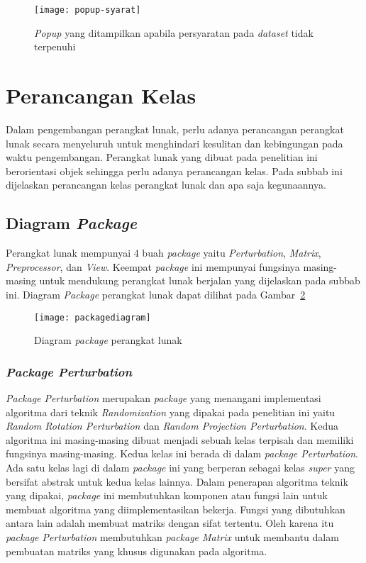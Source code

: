 \begin{figure}
	\centering
	\texttt{[image: popup-syarat]}
	\caption{\textit{Popup} yang ditampilkan apabila persyaratan pada \textit{dataset} tidak terpenuhi}
	\label{fig:popup-syarat}
\end{figure}

\section{Perancangan Kelas}
\label{sec:kelas}

Dalam pengembangan perangkat lunak, perlu adanya perancangan perangkat lunak secara menyeluruh untuk menghindari kesulitan dan kebingungan pada waktu pengembangan. Perangkat lunak yang dibuat pada penelitian ini berorientasi objek sehingga perlu adanya perancangan kelas. Pada subbab ini dijelaskan perancangan kelas perangkat lunak dan apa saja kegunaannya.

\subsection{Diagram \textit{Package}}
\label{subsec:diagram-package}

Perangkat lunak mempunyai 4 buah \textit{package} yaitu \textit{Perturbation}, \textit{Matrix}, \textit{Preprocessor}, dan \textit{View}. Keempat \textit{package} ini mempunyai fungsinya masing-masing untuk mendukung perangkat lunak berjalan yang dijelaskan pada subbab ini. Diagram \textit{Package} perangkat lunak dapat dilihat pada Gambar~\ref{fig:packagediagram}

\begin{figure}
	\centering
	\texttt{[image: packagediagram]}
	\caption{Diagram \textit{package} perangkat lunak}
	\label{fig:packagediagram}
\end{figure}

\subsubsection{\textit{Package Perturbation}}
\label{subsubsec:package-perturbation}

\textit{Package Perturbation} merupakan \textit{package} yang menangani implementasi algoritma dari teknik \textit{Randomization} yang dipakai pada penelitian ini yaitu \textit{Random Rotation Perturbation} dan \textit{Random Projection Perturbation}. Kedua algoritma ini masing-masing dibuat menjadi sebuah kelas terpisah dan memiliki fungsinya masing-masing. Kedua kelas ini berada di dalam \textit{package Perturbation}. Ada satu kelas lagi di dalam \textit{package} ini yang berperan sebagai kelas \textit{super} yang bersifat abstrak untuk kedua kelas lainnya. Dalam penerapan algoritma teknik yang dipakai, \textit{package} ini membutuhkan komponen atau fungsi lain untuk membuat algoritma yang diimplementasikan bekerja. Fungsi yang dibutuhkan antara lain adalah membuat matriks dengan sifat tertentu. Oleh karena itu \textit{package Perturbation} membutuhkan \textit{package Matrix} untuk membantu dalam pembuatan matriks yang khusus digunakan pada algoritma.

